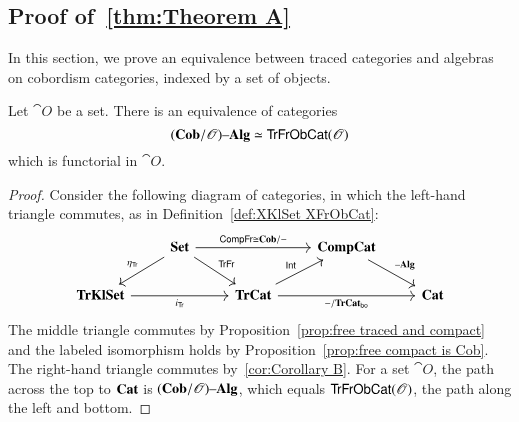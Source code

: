 \documentclass[12pt,oneside,article,draft]{memoir}
\begin{document}
\begin{enumerate}
\section{Proof of~\ref{thm:Theorem A}}\label{sec:proof of A}

In this section, we prove an equivalence between traced categories and algebras on cobordism categories, indexed by a set of objects. 

\begin{proposition}\label{prop:natural equivalence cob-O and traced-O}
	Let $\cat{O}$ be a set.
	There is an equivalence of categories 
		$$(\mathbf{Cob}/\mathscr{O}){\text \textendash}\mathbf{Alg}\simeq\mathsf{TrFrObCat}(\mathscr{O})$$
	which is functorial in $\cat{O}$.
\end{proposition}
\begin{proof}
	Consider the following diagram of categories, in which the left-hand triangle commutes, as in Definition~\ref{def:XKlSet XFrObCat}:
	$$
	\begin{tikzcd}
		&\Set\ar[rr,"\Fun{CompFr}\iso\Cat{Cob/-}"]\ar[dl,"\eta_{\Fun{Tr}}"']\ar[dr,"\Fun{TrFr}"]&&\Cat{CompCat}\ar[dr,"\alg"] \\
		\Cat{TrKlSet}\ar[rr,"i_{\Fun{Tr}}"']&&\Cat{TrCat}\ar[ur,"\Fun{Int}"]\ar[rr,"-/\TrCat_{\bo}"']
			&&\Cat{Cat}
	\end{tikzcd}
	$$
	The middle triangle commutes by Proposition~\ref{prop:free traced and compact} and the labeled isomorphism holds by Proposition~\ref{prop:free compact is Cob}.
	The right-hand triangle commutes by~\ref{cor:Corollary B}.
	For a set $\cat{O}$, the path across the top to $\mathbf{Cat}$ is $(\mathbf{Cob}/\mathscr{O}){\text \textendash}\mathbf{Alg}$, which equals $\mathsf{TrFrObCat}(\mathscr{O})$, the path along the left and bottom.
\end{proof}


\end{enumerate}
\end{document}
